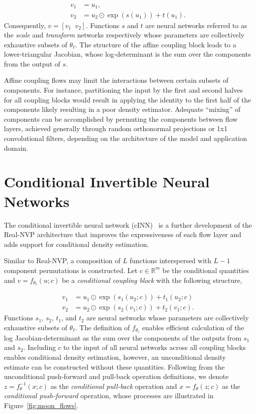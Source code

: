 \begin{align}
    v_1 &= u_1, \nonumber \\
    v_2 &= u_2 \odot \exp(s(u_1)) + t(u_1). \nonumber
\end{align}
Consequently, $v = \left[ v_1 \;\; v_2 \right]$.
Functions $s$ and $t$ are neural networks referred to as the \textit{scale} and \textit{transform} networks respectively
whose parameters are collectively exhaustive subsets of $\theta_\ell$.
The structure of the affine coupling block leads to a lower-triangular Jacobian, whose log-determinant is the
sum over the components from the output of $s$.

Affine coupling flows may limit the interactions between certain subsets of components.
For instance, partitioning the input by the first and second halves for all coupling blocks would result in applying
the identity to the first half of the components likely resulting in a poor density estimator.
Adequate ``mixing'' of components can be accomplished by permuting the components between flow layers, achieved
generally through random orthonormal projections or 1x1 convolutional filters, depending on the architecture of the
model and application domain.

\section{Conditional Invertible Neural Networks}\label{sec:conditional-invertible-neural-network}

The conditional invertible neural network (cINN)~\cite{cinn} is a further development of the Real-NVP architecture
that improves the expressiveness of each flow layer and adds support for conditional density estimation.

Similar to Real-NVP, a composition of $L$ functions interspersed with $L-1$ component permutations is constructed.
Let $c \in \mathbb{R}^m$ be the conditional quantities and $v = f_{\theta_\ell}(u; c)$ be a
\textit{conditional coupling block} with the following structure,

\begin{align}
    v_1 &= u_1 \odot \exp\left( s_1(u_2; c) \right) + t_1(u_2; c) \nonumber \\
    v_2 &= u_2 \odot \exp\left( s_2(v_1; c) \right) + t_2(v_1; c). \nonumber
\end{align}
Functions $s_1$, $s_2$, $t_1$, and $t_2$ are neural networks whose parameters are collectively exhaustive subsets of
$\theta_\ell$.
The definition of $f_{\theta_\ell}$ enables efficient calculation of the log Jacobian-determinant as the
sum over the components of the outputs from $s_1$ and $s_2$.
Including $c$ to the input of all neural networks across all coupling blocks enables conditional
density estimation, however, an unconditional density estimate can be constructed without these quantities.
Following from the unconditional push-forward and pull-back operation definitions, we denote $z = f_\theta^{-1}(x; c)$
as the \textit{conditional pull-back} operation and $x = f_\theta(z; c)$ as the \textit{conditional push-forward}
operation, whose processes are illustrated in Figure~\ref{fig:moon_flows}.

